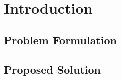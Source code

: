 \chapter{Introduction} \label{ch:introduction}

	\section{Problem Formulation} \label{sec:problem}
	
	\section{Proposed Solution} \label{sec:solution}
		
